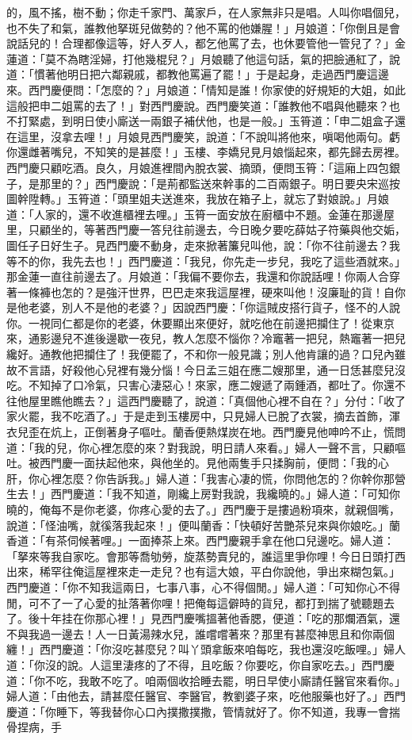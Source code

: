 的，風不搖，樹不動；你走千家門、萬家戶，在人家無非只是唱。人叫你唱個兒，也不失了和氣，誰教他拏斑兒做勢的？他不罵的他嫌腥！」月娘道：「你倒且是會說話兒的！合理都像這等，好人歹人，都乞他罵了去，也休要管他一管兒了？」金蓮道：「莫不為瞎淫婦，打他幾棍兒？」月娘聽了他這句話，氣的把臉通紅了，說道：「慣著他明日把六鄰親戚，都教他罵遍了罷！」于是起身，走過西門慶這邊來。西門慶便問：「怎麼的？」月娘道：「情知是誰！你家使的好規矩的大姐，如此這般把申二姐罵的去了！」對西門慶說。西門慶笑道：「誰教他不唱與他聽來？也不打緊處，到明日使小廝送一兩銀子補伏他，也是一般。」玉筲道：「申二姐盒子還在這里，沒拿去哩！」月娘見西門慶笑，說道：「不說叫將他來，嗔喝他兩句。虧你還雌著嘴兒，不知笑的是甚麼！」玉樓、李嬌兒見月娘惱起來，都先歸去房裡。西門慶只顧吃酒。良久，月娘進裡間內脫衣裳、摘頭，便問玉筲：「這廂上四包銀子，是那里的？」西門慶說：「是荊都監送來幹事的二百兩銀子。明日要央宋巡按圖幹陞轉。」玉筲道：「頭里姐夫送進來，我放在箱子上，就忘了對娘說。」月娘道：「人家的，還不收進櫃裡去哩。」玉筲一面安放在廚櫃中不題。金蓮在那邊屋里，只顧坐的，等著西門慶一答兒往前邊去，今日晚夕要吃薛姑子符藥與他交姤，圖任子日好生子。見西門慶不動身，走來掀著簾兒叫他，說：「你不往前邊去？我等不的你，我先去也！」西門慶道：「我兒，你先走一步兒，我吃了這些酒就來。」那金蓮一直往前邊去了。月娘道：「我偏不要你去，我還和你說話哩！你兩人合穿著一條褲也怎的？是強汗世界，巴巴走來我這屋裡，硬來叫他！沒廉耻的貨！自你是他老婆，別人不是他的老婆？」因說西門慶：「你這賊皮搭行貨子，怪不的人說你。一視同仁都是你的老婆，休要顯出來便好，就吃他在前邊把攔住了！從東京來，通影邊兒不進後邊歇一夜兒，教人怎麼不惱你？冷竈著一把兒，熱竈著一把兒纔好。通教他把攔住了！我便罷了，不和你一般見識；別人他肯讓的過？口兒內雖故不言語，好殺他心兒裡有幾分惱！今日孟三姐在應二嫂那里，通一日恁甚麼兒沒吃。不知掉了口冷氣，只害心淒惡心！來家，應二嫂遞了兩鍾酒，都吐了。你還不往他屋里瞧他瞧去？」這西門慶聽了，說道：「真個他心裡不自在？」分付：「收了家火罷，我不吃酒了。」于是走到玉樓房中，只見婦人已脫了衣裳，摘去首飾，渾衣兒歪在炕上，正倒著身子嘔吐。蘭香便熱煤炭在地。西門慶見他呻吟不止，慌問道：「我的兒，你心裡怎麼的來？對我說，明日請人來看。」婦人一聲不言，只顧嘔吐。被西門慶一面扶起他來，與他坐的。見他兩隻手只揉胸前，便問：「我的心肝，你心裡怎麼？你告訴我。」婦人道：「我害心凄的慌，你問他怎的？你幹你那營生去！」西門慶道：「我不知道，剛纔上房對我說，我纔曉的。」婦人道：「可知你曉的，俺每不是你老婆，你疼心愛的去了。」西門慶于是摟過粉項來，就親個嘴，說道：「怪油嘴，就徯落我起來！」便叫蘭香：「快頓好苦艷茶兒來與你娘吃。」蘭香道：「有茶伺候著哩。」一面捧茶上來。西門慶親手拿在他口兒邊吃。婦人道：「拏來等我自家吃。會那等喬劬勞，旋蒸勢賣兒的，誰這里爭你哩！今日日頭打西出來，稀罕往俺這屋裡來走一走兒？也有這大娘，平白你說他，爭出來糊包氣。」西門慶道：「你不知我這兩日，七事八事，心不得個閒。」婦人道：「可知你心不得閒，可不了一了心愛的扯落著你哩！把俺每這僻時的貨兒，都打到揣了號聽題去了。後十年挂在你那心裡！」見西門慶嘴搵著他香腮，便道：「吃的那爛酒氣，還不與我過一邊去！人一日黃湯辣水兒，誰嚐嚐著來？那里有甚麼神思且和你兩個纏！」西門慶道：「你沒吃甚麼兒？叫丫頭拿飯來咱每吃，我也還沒吃飯哩。」婦人道：「你沒的說。人這里淒疼的了不得，且吃飯？你要吃，你自家吃去。」西門慶道：「你不吃，我敢不吃了。咱兩個收拾睡去罷，明日早使小廝請任醫官來看你。」婦人道：「由他去，請甚麼任醫官、李醫官，教劉婆子來，吃他服藥也好了。」西門慶道：「你睡下，等我替你心口內撲撒撲撒，管情就好了。你不知道，我專一會揣骨捏病，手